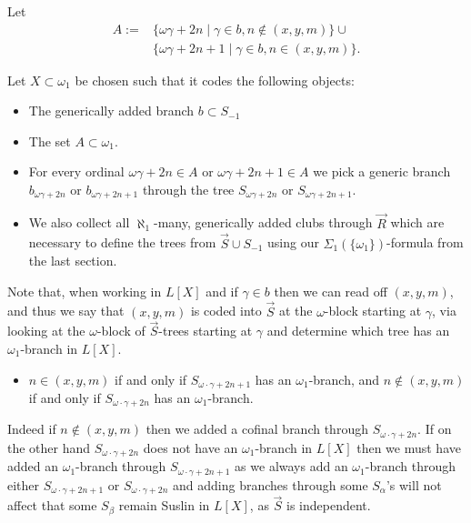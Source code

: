 \documentclass[a4paper,11pt]{article}
\begin{document}
  Let 
\begin{align*}
A:= &\{ \omega \gamma +2n \mid \gamma \in b, n \notin (x,y,m) \} \cup \\& \{\omega \gamma + 2n+1 \mid \gamma \in b, n \in (x,y,m) \}.
\end{align*}




Let $X \subset \omega_1$ be chosen such that it codes the following objects:
\begin{itemize}
\item The generically added branch $b \subset S_{-1}$
\item The set $A \subset \omega_1$.
\item For every ordinal $\omega \gamma +2n \in A$ or $\omega \gamma +2n +1 \in A$ we pick a generic branch $b_{\omega \gamma +2n}$ or $b_{\omega \gamma +2n+1}$ through the tree $S_{\omega \gamma +2n}$ or $S_{\omega \gamma +2n+1}$.
\item We also collect all $\aleph_1$-many, generically added clubs through $\vec{R}$ which are necessary to define the trees from $\vec{S} \cup S_{-1}$ using our $\Sigma_1 ( \{ \omega_1 \} )$-formula from the last section.
\end{itemize}

Note that, when working in $L[X]$ and if $\gamma \in b$ then
 we can read off $(x,y,m)$, and thus  we say that $(x,y,m)$ is coded into $\vec{S}$ at the $\omega$-block starting at $\gamma$,  via looking at the $\omega$-block of $\vec{S}$-trees starting at $\gamma$ and determine which tree has an $\omega_1$-branch in $L[X]$.
\begin{itemize}
 \item[$(\ast)_{\gamma}$]  $n \in (x,y,m)$ if and only if $S_{\omega \cdot \gamma +2n+1}$ has an $\omega_1$-branch, and $n \notin (x,y,m)$ if and only if $S_{\omega \cdot \gamma +2n}$ has an $\omega_1$-branch.
\end{itemize}
Indeed if $n \notin (x,y,m)$ then we added a cofinal branch through $S_{\omega \cdot \gamma+ 2n}$. If on the other hand $S_{\omega \cdot\gamma +2n}$ does not have an $\omega_1$-branch in $L[X]$ then we must have added an $\omega_1$-branch through $S_{\omega \cdot \gamma +2n+1}$ as we always add an $\omega_1$-branch through either $S_{\omega \cdot \gamma +2n+1}$ or $S_{\omega \cdot \gamma +2n}$ and adding branches through some $S_{\alpha}$'s  will not affect that some $S_{\beta}$ remain Suslin in $L[X]$, as $\vec{S}$ is independent.
\end{document}
